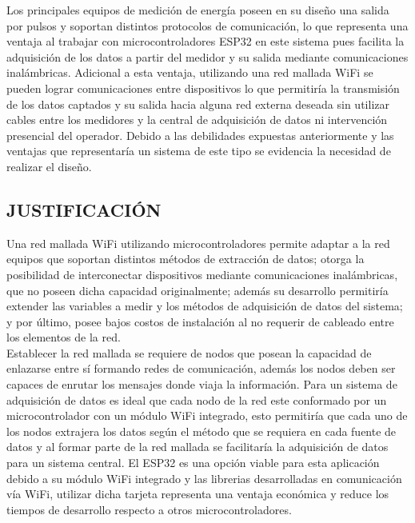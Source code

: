 \documentclass[12pt,letterpaper]{article}
\begin{document}
Los principales equipos de medición de energía poseen en su diseño una salida por pulsos y soportan distintos protocolos de comunicación, lo que representa una ventaja al trabajar con microcontroladores ESP32 en este sistema pues facilita la adquisición de los datos a partir del medidor y su salida mediante comunicaciones inalámbricas. Adicional a esta ventaja, utilizando una red mallada WiFi se pueden lograr comunicaciones entre dispositivos lo que permitiría la transmisión de los datos captados y su salida hacia alguna red externa deseada sin utilizar cables entre los medidores y la central de adquisición de datos ni intervención presencial del operador. Debido a las debilidades expuestas anteriormente y las ventajas que representaría un sistema de este tipo se evidencia la necesidad de realizar el diseño.


 \newpage


 \begin{center}
 	\section*{JUSTIFICACIÓN}
 \end{center}

\vspace{1cm}

Una red mallada WiFi utilizando microcontroladores permite adaptar a la red equipos que soportan distintos métodos de extracción de datos; otorga la posibilidad de interconectar dispositivos mediante comunicaciones inalámbricas, que no poseen dicha capacidad originalmente; además su desarrollo permitiría extender las variables a medir y los métodos de adquisición de datos del sistema; y por último, posee bajos costos de instalación al no requerir de cableado entre los elementos de la red. \\

Establecer la red mallada se requiere de nodos que posean la capacidad de enlazarse entre sí formando redes de comunicación, además los nodos deben ser capaces de enrutar los mensajes donde viaja la información. Para un sistema de adquisición de datos es ideal que cada nodo de la red este conformado por un microcontrolador con un módulo WiFi integrado, esto permitiría que cada uno de los nodos extrajera los datos según el método que se requiera en cada fuente de datos y al formar parte de la red mallada se facilitaría la adquisición de datos para un sistema central. El ESP32 es una opción viable para esta aplicación debido a su módulo WiFi integrado y las librerias desarrolladas en comunicación vía WiFi, utilizar dicha tarjeta representa una ventaja económica y reduce los tiempos de desarrollo respecto a otros microcontroladores.
\end{document}
